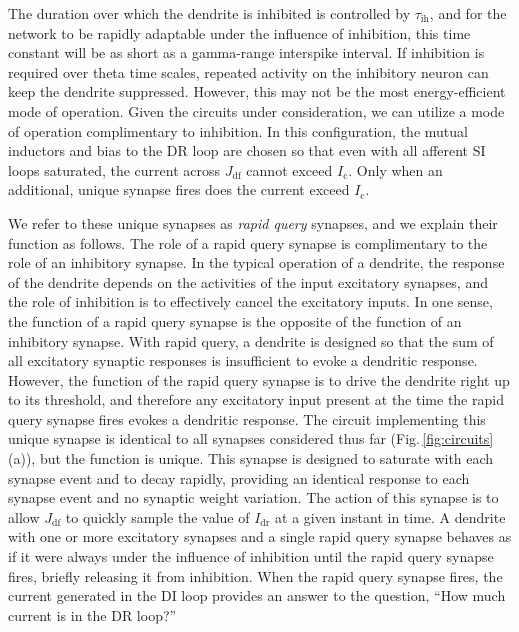 \documentclass[twocolumn]{article}
\begin{document}
The duration over which the dendrite is inhibited is controlled by $\tau_{\mathrm{ih}}$, and for the network to be rapidly adaptable under the influence of inhibition, this time constant will be as short as a gamma-range interspike interval. If inhibition is required over theta time scales, repeated activity on the inhibitory neuron can keep the dendrite suppressed. However, this may not be the most energy-efficient mode of operation. Given the circuits under consideration, we can utilize a mode of operation complimentary to inhibition. In this configuration, the mutual inductors and bias to the DR loop are chosen so that even with all afferent SI loops saturated, the current across $J_{\mathrm{df}}$ cannot exceed $I_{\mathrm{c}}$. Only when an additional, unique synapse fires does the current exceed $I_{\mathrm{c}}$. 

We refer to these unique synapses as \textit{rapid query} synapses, and we explain their function as follows. The role of a rapid query synapse is complimentary to the role of an inhibitory synapse. In the typical operation of a dendrite, the response of the dendrite depends on the activities of the input excitatory synapses, and the role of inhibition is to effectively cancel the excitatory inputs. In one sense, the function of a rapid query synapse is the opposite of the function of an inhibitory synapse. With rapid query, a dendrite is designed so that the sum of all excitatory synaptic responses is insufficient to evoke a dendritic response. However, the function of the rapid query synapse is to drive the dendrite right up to its threshold, and therefore any excitatory input present at the time the rapid query synapse fires evokes a dendritic response. The circuit implementing this unique synapse is identical to all synapses considered thus far (Fig.\,\ref{fig:circuits}(a)), but the function is unique. This synapse is designed to saturate with each synapse event and to decay rapidly, providing an identical response to each synapse event and no synaptic weight variation. The action of this synapse is to allow $J_{\mathrm{df}}$ to quickly sample the value of $I_{\mathrm{dr}}$ at a given instant in time. A dendrite with one or more excitatory synapses and a single rapid query synapse behaves as if it were always under the influence of inhibition until the rapid query synapse fires, briefly releasing it from inhibition. When the rapid query synapse fires, the current generated in the DI loop provides an answer to the question, ``How much current is in the DR loop?'' 
\end{document}
